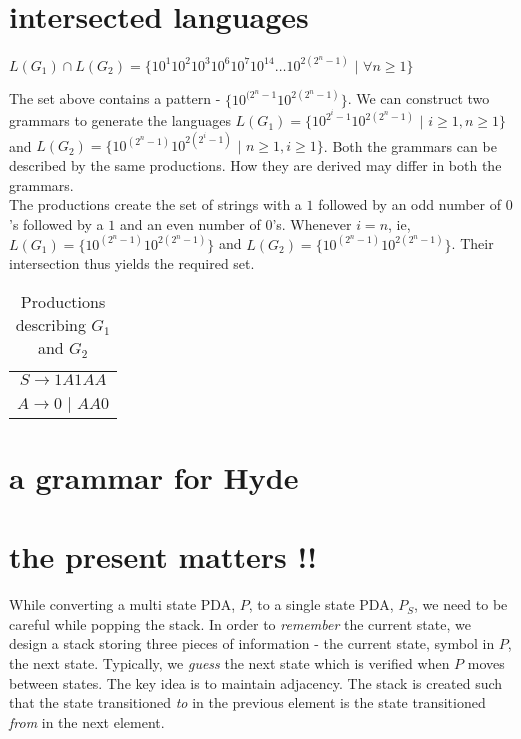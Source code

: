 \documentclass[11pt,letterpaper]{article}
\begin{document}
\section{intersected languages}
\begin{center}
    $L(G_1) \cap L(G_2) = \{10^1 10^2 10^3 10^6 10^7 10^{14} \dots 10^{2(2^n-1)}$ $|$ $\forall n \geq 1\}$
\end{center}
The set above contains a pattern - $\{10^{(2^n-1}10^{2(2^n-1)}\}$. We can construct two grammars to generate the languages $L(G_1) = \{10^{2^i-1}10^{2(2^n-1)}$ $|$ $i \geq 1, n \geq 1\}$ and $L(G_2) = \{10^{(2^n-1)}10^{2(2^i-1)}$ $|$ $n \geq 1, i \geq 1\}$. Both the grammars can be described by the same productions. How they are derived may differ in both the grammars. \\
The productions create the set of strings with a $1$ followed by an odd number of $0$'s followed by a $1$ and an even number of $0$'s. Whenever $i=n$, ie, $L(G_1) = \{10^{(2^n-1)}10^{2(2^n-1)}\}$ and $L(G_2) = \{10^{(2^n-1)}10^{2(2^n-1)}\}$. Their intersection thus yields the required set.
\begin{table}[!ht]
    \label{tab:02}
    \centering
    \begin{tabular}{c}
    $S \rightarrow 1A1AA$ \\
    $A \rightarrow 0$ $|$ $AA0$ \\
    \end{tabular}
    \caption{Productions describing $G_1$ and $G_2$}
\end{table}
\pagebreak

\section{a grammar for Hyde}
\pagebreak

\section{the present matters !!}
\paragraph{} While converting a multi state PDA, $P$, to a single state PDA, $P_S$, we need to be careful while popping the stack. In order to \textit{remember} the current state, we design a stack storing three pieces of information - the current state, symbol in $P$, the next state. Typically, we \textit{guess} the next state which is verified when $P$ moves between states. The key idea is to maintain adjacency. The stack is created such that the state transitioned \textit{to} in the previous element is the state transitioned \textit{from} in the next element.
\end{document}
